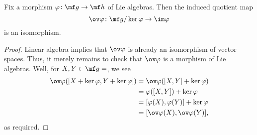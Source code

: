 \documentclass[../notes.tex]{subfiles}
\begin{document}
\begin{proposition}
	Fix a morphism $\varphi\colon\mf g\to\mf h$ of Lie algebras. Then the induced quotient map
	\[\ov\varphi\colon\mf g/\ker\varphi\to\im\varphi\]
	is an isomorphism.
\end{proposition}
\begin{proof}
	Linear algebra implies that $\ov\varphi$ is already an isomorphism of vector spaces. Thus, it merely remains to check that $\ov\varphi$ is a morphism of Lie algebras. Well, for $X,Y\in\mf g=$, we see
	\begin{align*}
		\ov\varphi([X+\ker\varphi,Y+\ker\varphi]) &= \ov\varphi([X,Y]+\ker\varphi) \\
		&= \varphi([X,Y])+\ker\varphi \\
		&= [\varphi(X),\varphi(Y)]+\ker\varphi \\
		&= [\ov\varphi(X),\ov\varphi(Y)],
	\end{align*}
	as required.
\end{proof}
\end{document}
